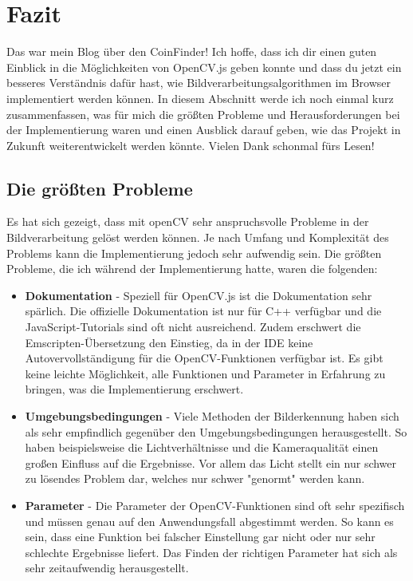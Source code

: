 \section{Fazit}

Das war mein Blog über den CoinFinder! Ich hoffe, dass ich dir einen guten Einblick in die Möglichkeiten von OpenCV.js geben konnte und dass du jetzt ein besseres Verständnis dafür hast, wie Bildverarbeitungsalgorithmen im Browser implementiert werden können. In diesem Abschnitt werde ich noch einmal kurz zusammenfassen, was für mich die größten Probleme und Herausforderungen bei der Implementierung waren und einen Ausblick darauf geben, wie das Projekt in Zukunft weiterentwickelt werden könnte. Vielen Dank schonmal fürs Lesen!

\subsection{Die größten Probleme}
Es hat sich gezeigt, dass mit openCV sehr anspruchsvolle Probleme in der Bildverarbeitung gelöst werden können. Je nach Umfang und Komplexität des Problems kann die Implementierung jedoch sehr aufwendig sein. Die größten Probleme, die ich während der Implementierung hatte, waren die folgenden:

\begin{itemize}
    \item \textbf{Dokumentation} - Speziell für OpenCV.js ist die Dokumentation sehr spärlich. Die offizielle Dokumentation ist nur für C++ verfügbar und die JavaScript-Tutorials sind oft nicht ausreichend. Zudem erschwert die Emscripten-Übersetzung den Einstieg, da in der IDE keine Autovervollständigung für die OpenCV-Funktionen verfügbar ist. Es gibt keine leichte Möglichkeit, alle Funktionen und Parameter in Erfahrung zu bringen, was die Implementierung erschwert.
    \item \textbf{Umgebungsbedingungen} - Viele Methoden der Bilderkennung haben sich als sehr empfindlich gegenüber den Umgebungsbedingungen herausgestellt. So haben beispielsweise die Lichtverhältnisse und die Kameraqualität einen großen Einfluss auf die Ergebnisse. Vor allem das Licht stellt ein nur schwer zu lösendes Problem dar, welches nur schwer "genormt" werden kann. 
    \item \textbf{Parameter} - Die Parameter der OpenCV-Funktionen sind oft sehr spezifisch und müssen genau auf den Anwendungsfall abgestimmt werden. So kann es sein, dass eine Funktion bei falscher Einstellung gar nicht oder nur sehr schlechte Ergebnisse liefert. Das Finden der richtigen Parameter hat sich als sehr zeitaufwendig herausgestellt.
\end{itemize}

